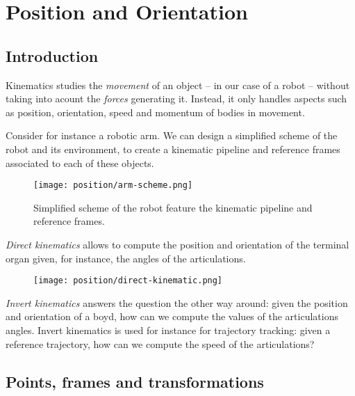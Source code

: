 \section{Position and Orientation}
\subsection{Introduction}
Kinematics studies the \emph{movement} of an object -- in our case of a robot -- without taking into acount the \emph{forces} generating it. Instead, it only handles aspects such as position, orientation, speed and momentum of bodies in movement.

Consider for instance a robotic arm. We can design a simplified scheme of the robot and its environment, to create a kinematic pipeline and reference frames associated to each of these objects.

\begin{figure}[H]
    \centering
    \texttt{[image: position/arm-scheme.png]}
    \caption{Simplified scheme of the robot feature the kinematic pipeline and reference frames.}
\end{figure}

\emph{Direct kinematics} allows to compute the position and orientation of the terminal organ given, for instance, the angles of the articulations.

\begin{figure}[H]
    \centering
    \texttt{[image: position/direct-kinematic.png]}
\end{figure}

\emph{Invert kinematics} answers the question the other way around: given the position and orientation of a boyd, how can we compute the values of the articulations angles. Invert kinematics is used for instance for trajectory tracking: given a reference trajectory, how can we compute the speed of the articulations?

\subsection{Points, frames and transformations}
